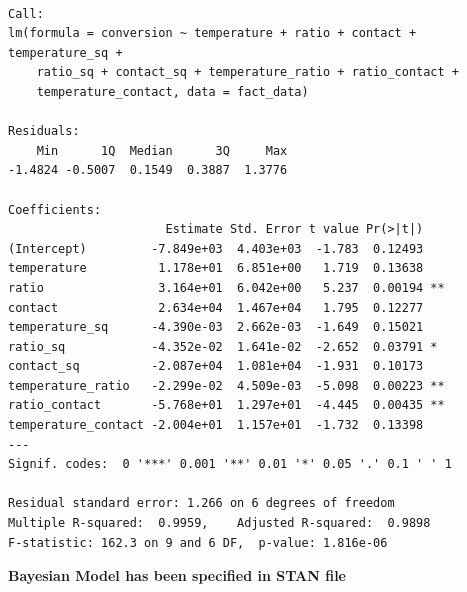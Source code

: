 \documentclass[
  10pt,
]{article}
\begin{document}
\begin{verbatim}

Call:
lm(formula = conversion ~ temperature + ratio + contact + temperature_sq + 
    ratio_sq + contact_sq + temperature_ratio + ratio_contact + 
    temperature_contact, data = fact_data)

Residuals:
    Min      1Q  Median      3Q     Max 
-1.4824 -0.5007  0.1549  0.3887  1.3776 

Coefficients:
                      Estimate Std. Error t value Pr(>|t|)   
(Intercept)         -7.849e+03  4.403e+03  -1.783  0.12493   
temperature          1.178e+01  6.851e+00   1.719  0.13638   
ratio                3.164e+01  6.042e+00   5.237  0.00194 **
contact              2.634e+04  1.467e+04   1.795  0.12277   
temperature_sq      -4.390e-03  2.662e-03  -1.649  0.15021   
ratio_sq            -4.352e-02  1.641e-02  -2.652  0.03791 * 
contact_sq          -2.087e+04  1.081e+04  -1.931  0.10173   
temperature_ratio   -2.299e-02  4.509e-03  -5.098  0.00223 **
ratio_contact       -5.768e+01  1.297e+01  -4.445  0.00435 **
temperature_contact -2.004e+01  1.157e+01  -1.732  0.13398   
---
Signif. codes:  0 '***' 0.001 '**' 0.01 '*' 0.05 '.' 0.1 ' ' 1

Residual standard error: 1.266 on 6 degrees of freedom
Multiple R-squared:  0.9959,    Adjusted R-squared:  0.9898 
F-statistic: 162.3 on 9 and 6 DF,  p-value: 1.816e-06
\end{verbatim}

\textbf{Bayesian Model has been specified in STAN file}
\end{document}
